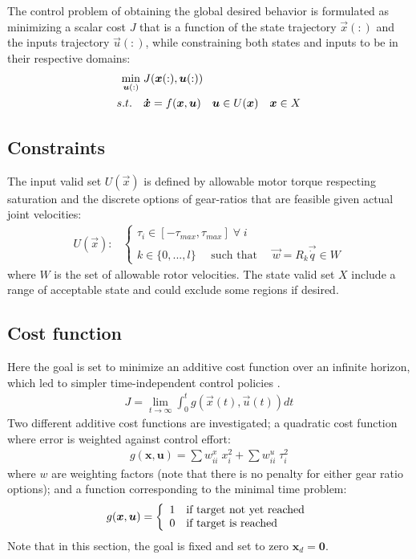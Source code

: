 The control problem of obtaining the global desired behavior is formulated as minimizing a scalar cost $J$ that is a function of the state trajectory $\vec{x}(:)$ and the inputs trajectory $\vec{u}(:)$, while constraining both states and inputs to be in their respective domains:
\begin{align}
	\operatornamewithlimits{min}\limits_{\vec{u}(:)} \; & J(\vec{x}(:),\vec{u}(:)) \\
	s.t. \quad & \vec{\dot{x}} = f(\vec{x}, \vec{u}) \quad \vec{u} \in U(\vec{x}) \quad \vec{x} \in X 
	\label{eq:min}
\end{align}

\subsection{Constraints}

The input valid set $U(\vec{x})$ is defined by allowable motor torque respecting saturation and the discrete options of gear-ratios that are feasible given actual joint velocities:
\begin{align}
	U(\vec{x}):&\left\{
	\begin{array}{l}
	\tau_i \in [ -\tau_{max} , \tau_{max} ] \;\forall\; i\\
	k      \in \{ 0 , ... , l \} \quad\text{ such that }\quad \vec{w} = R_k \vec{\dot{q}} \in W
	\end{array}
	\right.
\end{align}
where $W$ is the set of allowable rotor velocities. The state valid set $X$ include a range of acceptable state and could exclude some regions if desired. 

\subsection{Cost function}
\label{sec:CostFunction}

Here the goal is set to minimize an additive cost function over an infinite horizon, which led to simpler time-independent control policies \cite{bertsekas_dynamic_2000}.
%
\begin{align}
	J = \lim_{ t \rightarrow \infty} \int_0^t g(\vec{x}(t),\vec{u}(t)) dt 
	\label{eq:j_lim}
\end{align}
%
Two different additive cost functions are investigated; a quadratic cost function where error is weighted against control effort:
%
\begin{align}
	g(\boldsymbol{x},\boldsymbol{u}) = \sum w^x_{ii} \; x_i^2 + \sum w^u_{ii} \; \tau_i^2
	\label{eq:g_quad}
\end{align}
%
where $w$ are weighting factors (note that there is no penalty for either gear ratio options); and a function corresponding to the minimal time problem:
%
\begin{align}
	g(\boldsymbol{x},\boldsymbol{u}) = \left \{ \begin{array}[pos]{l}	1 \quad   \text{if target not yet reached} \\ 0 \quad   \text{if target is reached} \end{array}  \right.
	\label{eq:g_time}
\end{align}
%
Note that in this section, the goal is fixed and set to zero $\boldsymbol{x}_d=\boldsymbol{0}$.



